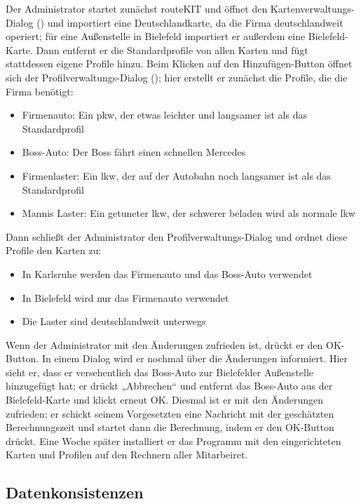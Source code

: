 \documentclass[a4paper, 11pt]{article}
\begin{document}
\begin{description}
Der Administrator startet zunächst routeKIT und öffnet den Kartenverwaltungs-Dialog () und importiert eine Deutschlandkarte, da die Firma deutschlandweit operiert; für eine Außenstelle in Bielefeld importiert er außerdem eine Bielefeld-Karte. Dann entfernt er die Standardprofile von allen Karten und fügt stattdessen eigene Profile hinzu. Beim Klicken auf den Hinzufügen-Button öffnet sich der Profilverwaltungs-Dialog (); hier erstellt er zunächst die Profile, die die Firma benötigt:
\begin{itemize}
\item Firmenauto: Ein \gls{pkw}, der etwas leichter und langsamer ist als das Standardprofil
\item Boss-Auto: Der Boss fährt einen schnellen Mercedes
\item Firmenlaster: Ein \gls{lkw}, der auf der Autobahn noch langsamer ist als das Standardprofil
\item Mannis Laster: Ein getuneter \gls{lkw}, der schwerer beladen wird als normale \gls{lkw}
\end{itemize}
Dann schließt der Administrator den Profilverwaltungs-Dialog und ordnet diese Profile den Karten zu:
\begin{itemize}
\item In Karlsruhe werden das Firmenauto und das Boss-Auto verwendet
\item In Bielefeld wird nur das Firmenauto verwendet
\item Die Laster sind deutschlandweit unterwegs
\end{itemize}
Wenn der Administrator mit den Änderungen zufrieden ist, drückt er den OK-Button. In einem Dialog wird er nochmal über die Änderungen informiert. Hier sieht er, dass er versehentlich das Boss-Auto zur Bielefelder Außenstelle hinzugefügt hat; er drückt „Abbrechen“ und entfernt das Boss-Auto aus der Bielefeld-Karte und klickt erneut OK. Diesmal ist er mit den Änderungen zufrieden; er schickt seinem Vorgesetzten eine Nachricht mit der geschätzten Berechnungszeit und startet dann die Berechnung, indem er den OK-Button drückt. Eine Woche später installiert er das Programm mit den eingerichteten Karten und Profilen auf den Rechnern aller Mitarbeiret.

\end{description}

\subsection{Datenkonsistenzen}
\end{document}

